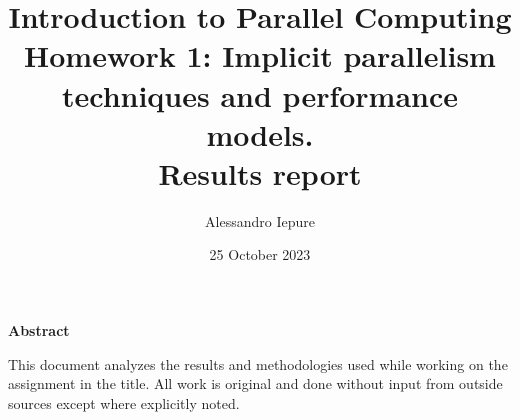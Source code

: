 \documentclass{article}
\begin{document}
    \title{Introduction to Parallel Computing\\%
    Homework 1: Implicit parallelism techniques and performance
    models.\\%
    \textbf{Results report}%
    }
    \author{Alessandro Iepure}
    \date{25 October 2023}
    \maketitle

    \begin{center}
        \textbf{Abstract}
    \end{center}
    This document analyzes the results and methodologies used while working on the assignment in the title. All work is %
    original and done without input from outside sources except where explicitly noted.
    
    
    \clearpage
    

    \clearpage
    \printbibliography
\end{document}
